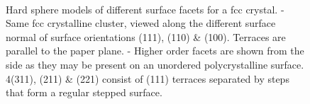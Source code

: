 \begin{figure}\centering
	 \quad%
	 \quad%
	 \\
	 \quad%
	 \quad%
	\quad
	\caption{Hard sphere models of different surface facets for a fcc crystal. - Same fcc crystalline cluster, viewed along the different surface normal of surface orientations (111), (110) \& (100). Terraces are parallel to the paper plane. - Higher order facets are shown from the side as they may be present on an unordered polycrystalline surface. 4(311), (211) \& (221) consist of (111) terraces separated by steps that form a regular stepped surface.
}
\end{figure}
